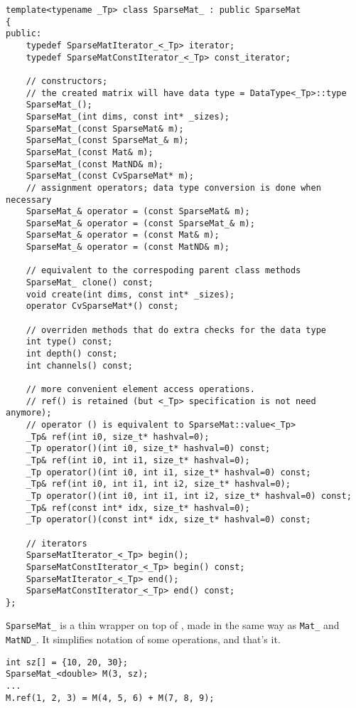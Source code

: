 \begin{lstlisting}
template<typename _Tp> class SparseMat_ : public SparseMat
{
public:
    typedef SparseMatIterator_<_Tp> iterator;
    typedef SparseMatConstIterator_<_Tp> const_iterator;

    // constructors;
    // the created matrix will have data type = DataType<_Tp>::type
    SparseMat_();
    SparseMat_(int dims, const int* _sizes);
    SparseMat_(const SparseMat& m);
    SparseMat_(const SparseMat_& m);
    SparseMat_(const Mat& m);
    SparseMat_(const MatND& m);
    SparseMat_(const CvSparseMat* m);
    // assignment operators; data type conversion is done when necessary
    SparseMat_& operator = (const SparseMat& m);
    SparseMat_& operator = (const SparseMat_& m);
    SparseMat_& operator = (const Mat& m);
    SparseMat_& operator = (const MatND& m);

    // equivalent to the correspoding parent class methods
    SparseMat_ clone() const;
    void create(int dims, const int* _sizes);
    operator CvSparseMat*() const;

    // overriden methods that do extra checks for the data type
    int type() const;
    int depth() const;
    int channels() const;
    
    // more convenient element access operations.
    // ref() is retained (but <_Tp> specification is not need anymore);
    // operator () is equivalent to SparseMat::value<_Tp>
    _Tp& ref(int i0, size_t* hashval=0);
    _Tp operator()(int i0, size_t* hashval=0) const;
    _Tp& ref(int i0, int i1, size_t* hashval=0);
    _Tp operator()(int i0, int i1, size_t* hashval=0) const;
    _Tp& ref(int i0, int i1, int i2, size_t* hashval=0);
    _Tp operator()(int i0, int i1, int i2, size_t* hashval=0) const;
    _Tp& ref(const int* idx, size_t* hashval=0);
    _Tp operator()(const int* idx, size_t* hashval=0) const;

    // iterators
    SparseMatIterator_<_Tp> begin();
    SparseMatConstIterator_<_Tp> begin() const;
    SparseMatIterator_<_Tp> end();
    SparseMatConstIterator_<_Tp> end() const;
};
\end{lstlisting}

\texttt{SparseMat\_} is a thin wrapper on top of , made in the same way as \texttt{Mat\_} and \texttt{MatND\_}.
It simplifies notation of some operations, and that's it.
\begin{lstlisting}
int sz[] = {10, 20, 30};
SparseMat_<double> M(3, sz);
...
M.ref(1, 2, 3) = M(4, 5, 6) + M(7, 8, 9);
\end{lstlisting}
\fi
